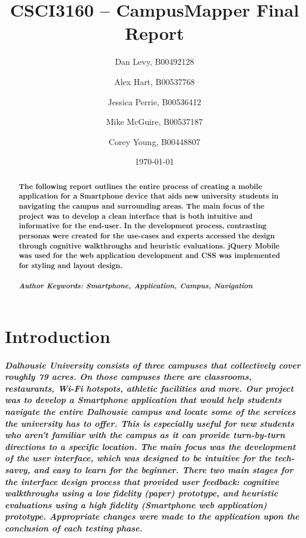 \documentclass{report}
\title{CSCI3160 -- CampusMapper Final Report}
\author{Dan Levy, B00492128 \and Alex Hart, B00537768 \and Jessica Perrie,
B00536412 \and Mike McGuire, B00537187 \and Corey Young, B00448807}
\date{\today}
\begin{document}
\maketitle
\tableofcontents
\listoffigures
\begin{abstract}
    \paragraph{The following report outlines the entire process of creating a
    mobile application for a Smartphone device that aids new university students in
    navigating the campus and surrounding areas. The main focus of the project was
    to develop a clean interface that is both intuitive and informative for the
    end-user. In the development process, contrasting personas were created for the
    use-cases and experts accessed the design through cognitive walkthroughs and
    heuristic evaluations. jQuery Mobile was used for the web application
    development and CSS was implemented for styling and layout design.}
    \paragraph{\emph{Author Keywords: Smartphone, Application, Campus, Navigation}}
\end{abstract}
\chapter{Introduction}
    \paragraph{Dalhousie University consists of three campuses that collectively
    cover roughly 79 acres. On those campuses there are classrooms, restaurants,
    Wi-Fi hotspots, athletic facilities and more. Our project was to develop a
    Smartphone application that would help students navigate the entire Dalhousie
    campus and locate some of the services the university has to offer. This is
    especially useful for new students who aren’t familiar with the campus as it can
    provide turn-by-turn directions to a specific location. The main focus was the
    development of the user interface, which was designed to be intuitive for the
    tech-savvy, and easy to learn for the beginner. There two main stages for the
    interface design process that provided user feedback: cognitive walkthroughs
    using a low fidelity (paper) prototype, and heuristic evaluations using a high
    fidelity (Smartphone web application) prototype. Appropriate changes were made
    to the application upon the conclusion of each testing phase.}
\end{document}
